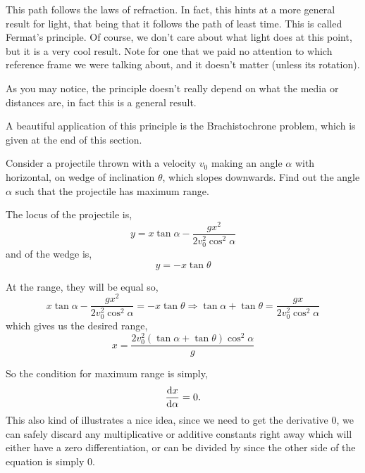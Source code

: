     This path follows the laws of refraction. In fact, this hints at a more general result for light, 
    that being that it follows the path of least time. This is called Fermat's principle.
     Of course, we don't care about what light does at this point, but it is a very cool 
     result. Note for one that we paid no attention to which reference frame we were talking about, and it 
     doesn't matter (unless its rotation).

    As you may notice, the principle doesn't really depend on what the media or distances are,
    in fact this is a general result.  

    A beautiful application of this principle is the Brachistochrone problem, which is given at the end of this section. 

    \begin{example}
        \label{ex: max-wedge-projectile}
        Consider a projectile thrown with a velocity $v_0$ making an angle $\alpha$ with horizontal, on wedge of inclination 
        $\theta$, which slopes downwards. Find out the angle $\alpha$ such that the projectile has maximum range.

        \begin{soln}
            The locus of the projectile is,
            \[
            y = x \tan \alpha - \frac{g x^2}{2 v_0^2 \cos^2 \alpha}
            \]
            and of the wedge is,
            \[
            y = -x \tan \theta
            \]
                    
            At the range, they will be equal so,      
            \[
            x \tan \alpha - \frac{g x^2}{2 v_0^2 \cos^2 \alpha} = 
            -x \tan \theta 
            \Longrightarrow \tan \alpha + \tan \theta = 
            \frac{g x}{2 v_0^2 \cos^2 \alpha}
            \]
            which gives us the desired range,      
            \[
            x = \frac{2 v_0^2 (\tan \alpha + \tan \theta) 
            \cos^2 \alpha}{g}
            \]
                    
            So the condition for maximum range is simply,
            \[
            \dv{x}{\alpha} = 0.
            \]
            This also kind of illustrates a nice idea, since we need to get 
            the derivative 0, we can safely discard any multiplicative or 
            additive constants right away which will either have a zero 
            differentiation, or can be divided by since the other side of 
            the equation is simply 0.
                    

\end{soln}
\end{example}
